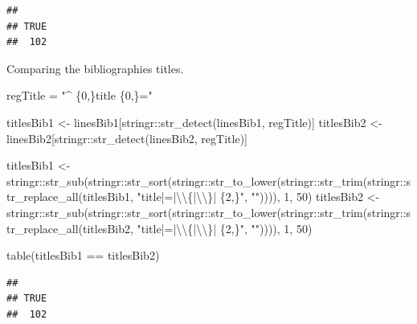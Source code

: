 \documentclass[
]{article}
\newenvironment{Shaded}{\begin{snugshade}}{\end{snugshade}}
\newcommand{\DecValTok}[1]{\textcolor[rgb]{0.00,0.00,0.81}{#1}}
\newcommand{\FunctionTok}[1]{\textcolor[rgb]{0.00,0.00,0.00}{#1}}
\newcommand{\NormalTok}[1]{#1}
\newcommand{\OtherTok}[1]{\textcolor[rgb]{0.56,0.35,0.01}{#1}}
\newcommand{\SpecialCharTok}[1]{\textcolor[rgb]{0.00,0.00,0.00}{#1}}
\newcommand{\StringTok}[1]{\textcolor[rgb]{0.31,0.60,0.02}{#1}}
\begin{document}
\begin{verbatim}
## 
## TRUE 
##  102
\end{verbatim}

Comparing the bibliographies titles.

\begin{Shaded}
\begin{Highlighting}[]
\NormalTok{regTitle }\OtherTok{=} \StringTok{"\^{} \{0,\}title \{0,\}="}

\NormalTok{titlesBib1 }\OtherTok{\textless{}{-}}\NormalTok{ linesBib1[stringr}\SpecialCharTok{::}\FunctionTok{str\_detect}\NormalTok{(linesBib1, regTitle)]}
\NormalTok{titlesBib2 }\OtherTok{\textless{}{-}}\NormalTok{ linesBib2[stringr}\SpecialCharTok{::}\FunctionTok{str\_detect}\NormalTok{(linesBib2, regTitle)]}

\NormalTok{titlesBib1 }\OtherTok{\textless{}{-}}\NormalTok{ stringr}\SpecialCharTok{::}\FunctionTok{str\_sub}\NormalTok{(stringr}\SpecialCharTok{::}\FunctionTok{str\_sort}\NormalTok{(stringr}\SpecialCharTok{::}\FunctionTok{str\_to\_lower}\NormalTok{(stringr}\SpecialCharTok{::}\FunctionTok{str\_trim}\NormalTok{(stringr}\SpecialCharTok{::}\FunctionTok{str\_replace\_all}\NormalTok{(titlesBib1, }\StringTok{"title|=|}\SpecialCharTok{\textbackslash{}\textbackslash{}}\StringTok{\{|}\SpecialCharTok{\textbackslash{}\textbackslash{}}\StringTok{\}| \{2,\}"}\NormalTok{, }\StringTok{""}\NormalTok{)))), }\DecValTok{1}\NormalTok{, }\DecValTok{50}\NormalTok{)}
\NormalTok{titlesBib2 }\OtherTok{\textless{}{-}}\NormalTok{ stringr}\SpecialCharTok{::}\FunctionTok{str\_sub}\NormalTok{(stringr}\SpecialCharTok{::}\FunctionTok{str\_sort}\NormalTok{(stringr}\SpecialCharTok{::}\FunctionTok{str\_to\_lower}\NormalTok{(stringr}\SpecialCharTok{::}\FunctionTok{str\_trim}\NormalTok{(stringr}\SpecialCharTok{::}\FunctionTok{str\_replace\_all}\NormalTok{(titlesBib2, }\StringTok{"title|=|}\SpecialCharTok{\textbackslash{}\textbackslash{}}\StringTok{\{|}\SpecialCharTok{\textbackslash{}\textbackslash{}}\StringTok{\}| \{2,\}"}\NormalTok{, }\StringTok{""}\NormalTok{)))), }\DecValTok{1}\NormalTok{, }\DecValTok{50}\NormalTok{)}

\FunctionTok{table}\NormalTok{(titlesBib1 }\SpecialCharTok{==}\NormalTok{ titlesBib2)}
\end{Highlighting}
\end{Shaded}

\begin{verbatim}
## 
## TRUE 
##  102
\end{verbatim}
\end{document}
